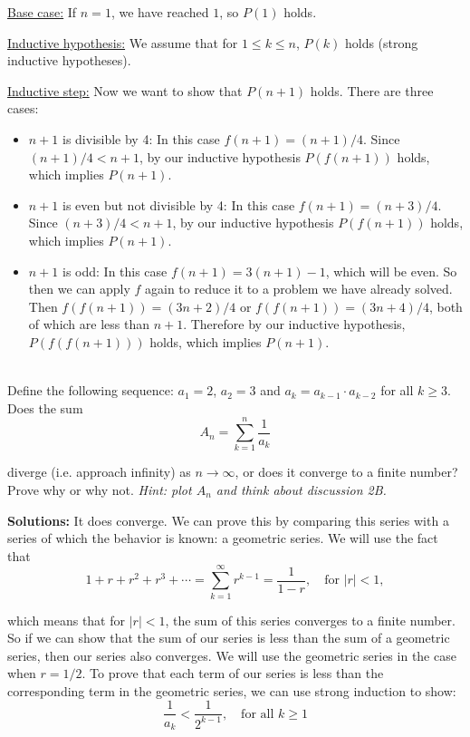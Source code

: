 \documentclass[11pt]{article}
\newif\ifsolutions
\renewcommand{\answer}[1]{{\color{mydarkblue}\textbf{Solutions: }#1}}
\begin{document}
\begin{qunlist}
{\underline{Base case:} If $n=1$, we have reached $1$, so $P(1)$ holds.

\underline{Inductive hypothesis:} We assume that for $1 \leq k \leq n$, 
$P(k)$ holds (strong inductive hypotheses).

\underline{Inductive step:} Now we want to show that $P(n+1)$ holds. There are three cases:
\begin{itemize}
\item $n+1$ is divisible by 4: In this case $f(n+1) = (n+1)/4$. 
Since $(n+1)/4 < n+1$, by our inductive hypothesis $P(f(n+1))$ holds, which implies $P(n+1)$.
\item $n+1$ is even but not divisible by 4: In this case $f(n+1) = (n+3)/4$. 
Since $(n+3)/4 < n+1$, by our inductive hypothesis $P(f(n+1))$ holds, which implies $P(n+1)$.
\item $n+1$ is odd: In this case $f(n+1) = 3(n+1) - 1$, which will be even.  
So then we can apply $f$ again to reduce it to a problem we have already solved.  
Then $f(f(n+1)) = (3n+2)/4$ or $f(f(n+1)) = (3n+4)/4$, both of which are less than $n+1$.  
Therefore by our inductive hypothesis, $P(f(f(n+1)))$ holds, which implies $P(n+1)$.
\end{itemize}
}
\fi

\pagebreak

 \\
Define the following sequence: $a_1 =2$, $a_2 = 3$ and $a_k = a_{k-1} \cdot a_{k-2}$ for all $k \geq 3$. \\ 
Does the sum 
\[ A_n = \sum_{k=1}^n \frac{1}{a_k} \]

diverge (i.e. approach infinity) as $n \to \infty$, or does it converge to a finite number?  
Prove why or why not.
{\em Hint: plot $A_n$ and think about discussion 2B.}

\ifsolutions
\answer{
It does converge. We can prove this by comparing this series with a series of which the behavior is known: 
a geometric series. We will use the fact that
\[ 1 + r + r^2 + r^3 + \cdots = \sum_{k=1}^{\infty} r^{k-1} = \frac{1}{1-r}, \quad \text{for } |r| < 1, \]

which means that for $|r| < 1$, the sum of this series converges to a finite number. 
So if we can show that the sum of our series is less than the sum of a geometric series, 
then our series also converges. We will use the geometric series in the case when $r = 1/2$.
To prove that each term of our series is less than the corresponding term in the geometric series, 
we can use strong induction to show:
\[ \frac{1}{a_k} < \frac{1}{2^{k-1}}, \quad \text{for all } k \geq 1 \]

}
\end{qunlist}
\end{document}
